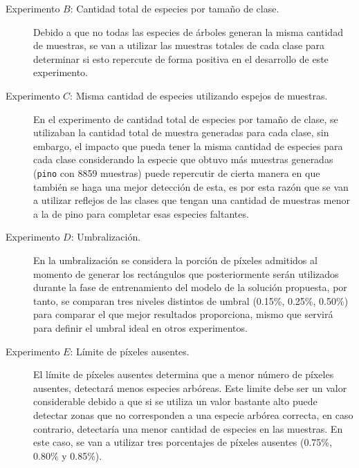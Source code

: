 \documentclass[a0,portrait]{a0poster}
\begin{document}
\begin{multicols}{2}
\begin{description}
\item[Experimento $B$:  Cantidad total de especies por tamaño de clase.]{Debido a que no todas las especies de árboles generan la misma cantidad de muestras, se van a utilizar las muestras totales de cada clase para determinar si esto repercute de forma positiva en el desarrollo de este experimento.}

\item[Experimento $C$: Misma cantidad de especies utilizando espejos de muestras.]{En el experimento de cantidad total de especies por tamaño de clase, se utilizaban la cantidad total de muestra generadas para cada clase, sin embargo, el impacto que pueda tener la misma cantidad de especies para cada clase considerando la especie que obtuvo más muestras generadas (\texttt{pino} con 8859 muestras) puede repercutir de cierta manera en que también se haga una mejor detección de esta, es por esta razón que se van a utilizar reflejos de las clases que tengan una cantidad de muestras menor a la de pino para completar esas especies faltantes.}

\item[Experimento $D$: Umbralización.]{En la umbralización se considera la porción de píxeles admitidos al momento de generar los rectángulos que posteriormente serán utilizados durante la fase de entrenamiento del modelo de la solución propuesta, por tanto, se comparan tres niveles distintos de umbral  (0.15\%, 0.25\%, 0.50\%) para comparar el que mejor resultados proporciona, mismo que servirá para definir el umbral ideal en otros experimentos.} 

\item[Experimento $E$: Límite de píxeles ausentes.]{El límite de píxeles ausentes determina que a menor número de píxeles ausentes, detectará menos especies arbóreas. Este limite debe ser un valor considerable debido a que si se utiliza un valor bastante alto puede detectar zonas que no corresponden a una especie arbórea correcta, en caso contrario, detectaría una menor cantidad de especies en las muestras. En este caso, se van a utilizar tres porcentajes de píxeles ausentes (0.75\%, 0.80\% y 0.85\%).}
\end{description}


\end{multicols}
\end{document}
